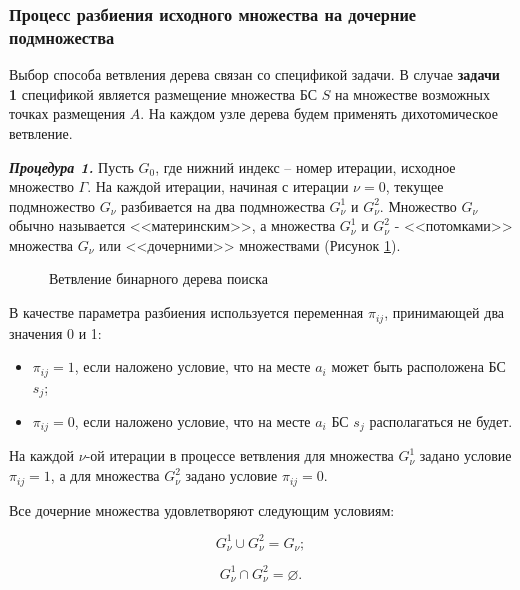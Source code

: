 \subsubsection{Процесс разбиения исходного множества на дочерние подмножества}

Выбор способа ветвления дерева связан со спецификой задачи. В случае \textbf{задачи 1} спецификой является размещение множества БС $S$ на множестве возможных точках размещения $A$. На каждом узле дерева будем применять дихотомическое ветвление.

\textit{\textbf{Процедура 1.}} Пусть $G_0$, где нижний индекс – номер итерации, исходное множество $\Gamma$. На каждой итерации, начиная с итерации $\nu=0$, текущее подмножество $G_\nu$ разбивается на два подмножества $G^1_\nu$ и $G^2_\nu$. Множество $G_\nu$ обычно называется <<материнским>>, а множества $G^1_\nu$  и $G^2_\nu$  - <<потомками>> множества $G_\nu$ или <<дочерними>> множествами (Рисунок \cref{fig:part2_bst_child_nodes}).

\begin{figure}[ht]
  \caption{Ветвление бинарного дерева поиска}\label{fig:part2_bst_child_nodes}
\end{figure}

В качестве параметра разбиения используется переменная $\pi_{ij}$, принимающей два значения 0 и 1:

\begin{itemize}
    \item $\pi_{ij}=1$, если наложено условие, что на месте $a_i$ может быть расположена БС $s_j$;
    \item $\pi_{ij} = 0$, если наложено условие, что на месте $a_i$ БС $s_j$  располагаться не будет.
\end{itemize}

На каждой  $\nu$-ой итерации в процессе ветвления для множества $G^1_\nu$ задано условие $\pi_{ij}=1$, а для множества $G^2_\nu$  задано условие $\pi_{ij} = 0$.

Все дочерние множества удовлетворяют следующим условиям:

\begin{equation}
    \label{eq:part4_G_cup}
    G^1_\nu \cup G^2_\nu = G_\nu;
\end{equation}


\begin{equation}
    \label{eq:part4_G_cap}
    G^1_\nu \cap G^2_\nu = \varnothing.
\end{equation}

